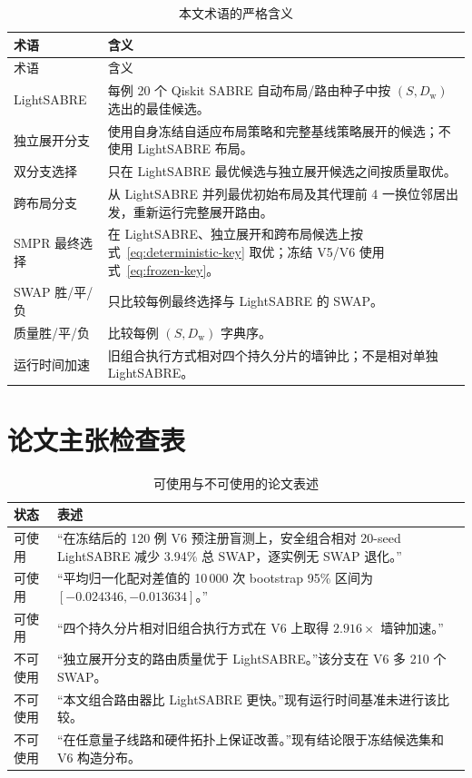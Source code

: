 \documentclass[11pt,a4paper]{article}
\renewcommand{\arraystretch}{1.18}
\newcommand{\DepthW}{D_{\mathrm w}}
\begin{document}
\begin{longtable}{p{}p{}}
\caption{本文术语的严格含义}\label{tab:terminology}\\
\toprule
术语 & 含义 \\
\midrule
\endfirsthead
\toprule
术语 & 含义 \\
\midrule
\endhead
LightSABRE & 每例 20 个 Qiskit SABRE 自动布局/路由种子中按 $(S,\DepthW)$ 选出的最佳候选。\\
独立展开分支 & 使用自身冻结自适应布局策略和完整基线策略展开的候选；不使用 LightSABRE 布局。\\
双分支选择 & 只在 LightSABRE 最优候选与独立展开候选之间按质量取优。\\
跨布局分支 & 从 LightSABRE 并列最优初始布局及其代理前 4 一换位邻居出发，重新运行完整展开路由。\\
SMPR 最终选择 & 在 LightSABRE、独立展开和跨布局候选上按式~\eqref{eq:deterministic-key} 取优；冻结 V5/V6 使用式~\eqref{eq:frozen-key}。\\
SWAP 胜/平/负 & 只比较每例最终选择与 LightSABRE 的 SWAP。\\
质量胜/平/负 & 比较每例 $(S,\DepthW)$ 字典序。\\
运行时间加速 & 旧组合执行方式相对四个持久分片的墙钟比；不是相对单独 LightSABRE。\\
\bottomrule
\end{longtable}

\section{论文主张检查表}

\begingroup
\setlength{\tabcolsep}{4pt}
\renewcommand{\arraystretch}{0.90}
\begin{table}[H]
\centering
\footnotesize
\caption{可使用与不可使用的论文表述}
\label{tab:claim-checklist}
\begin{tabularx}{\textwidth}{C{1.2cm}Y}
\toprule
状态 & 表述 \\
\midrule
\textcolor{GainGreen}{可使用} &
“在冻结后的 120 例 V6 预注册盲测上，安全组合相对 20-seed LightSABRE 减少 3.94\% 总 SWAP，逐实例无 SWAP 退化。”\\
\textcolor{GainGreen}{可使用} &
“平均归一化配对差值的 10\,000 次 bootstrap 95\% 区间为 $[-0.024346,-0.013634]$。”\\
\textcolor{GainGreen}{可使用} &
“四个持久分片相对旧组合执行方式在 V6 上取得 $2.916\times$ 墙钟加速。”\\
\textcolor{WarnRed}{不可使用} &
“独立展开分支的路由质量优于 LightSABRE。”该分支在 V6 多 210 个 SWAP。\\
\textcolor{WarnRed}{不可使用} &
“本文组合路由器比 LightSABRE 更快。”现有运行时间基准未进行该比较。\\
\textcolor{WarnRed}{不可使用} &
“在任意量子线路和硬件拓扑上保证改善。”现有结论限于冻结候选集和 V6 构造分布。\\
\bottomrule
\end{tabularx}
\end{table}
\endgroup
\end{document}

